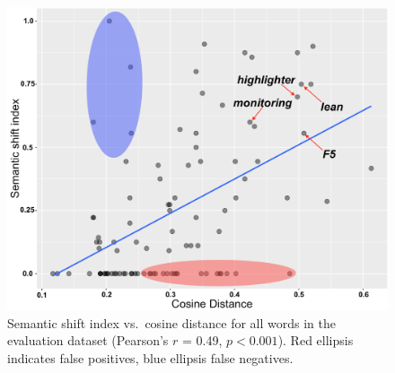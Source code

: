 \begin{figure}[t]\centering
\includegraphics[width=\columnwidth]{images/cosine_distance_shift_index_annotated_2.png}
\caption{Semantic shift index vs.~cosine distance for all words in the evaluation dataset (Pearson's $r$ = 0.49, $p< 0.001$). 
Red ellipsis indicates false positives, blue ellipsis false
negatives.
\label{fig:shift-cosine}}
\end{figure}




